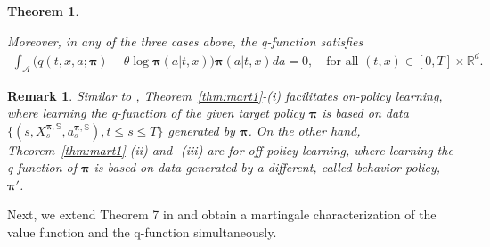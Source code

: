 \documentclass[11pt]{article}
\newtheorem{theorem}{Theorem}
\newtheorem{remark}{Remark}
\newcommand{\1}{\mathbbm{1}}
\begin{document}
\begin{theorem}
\begin{enumerate}
\end{enumerate}
Moreover, in any of the three cases above, the q-function satisfies
\begin{align}
	\int_{\mathcal{A}} \big( q(t,x, a; \boldsymbol{\pi}) - \theta \log \boldsymbol{\pi}(a| t,x)\big) \boldsymbol{\pi}(a|t,x) da =0, \quad \text{for all $(t,x) \in [0, T] \times \mathbb{R}^d $}.
\end{align}
\end{theorem}

\begin{remark}
Similar to \cite{jia2022q,jia2025erratum}, Theorem~\ref{thm:mart1}-(i) facilitates on-policy learning, where learning the q-function of the given target policy $\boldsymbol{\pi}$ is based on data $\{(s, X_s^{ \boldsymbol{\pi}, \mathbb{S}}, a_s^{ \boldsymbol{\pi}, \mathbb{S}}), t \le s \le T \}$ generated by $\boldsymbol{\pi}$. On the other hand, Theorem~\ref{thm:mart1}-(ii) and -(iii) are for off-policy learning, where learning the q-function of $\boldsymbol{\pi}$ is based on data generated by a different, called behavior policy, $\boldsymbol{\pi}'$.
\end{remark}

Next, we extend Theorem 7 in \cite{jia2022q,jia2025erratum} and obtain a martingale characterization of the value function and the q-function simultaneously.
\end{document}
